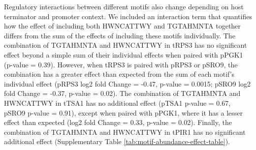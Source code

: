 \documentclass{SBCbookchapter}
\begin{document}
Regulatory interactions between different motifs also change depending on host terminator and promoter context.
We included an interaction term that quantifies how the effect of including both HWNCATTWY and TGTAHMNTA together differs from the sum of the effects of including these motifs individually.
The combination of TGTAHMNTA and HWNCATTWY in tRPS3 has no significant effect beyond a simple sum of their individual effects when paired with pPGK1 (p-value = 0.39).
However, when tRPS3 is paired with pRPS3 or pSRO9, the combination has a greater effect than expected from the sum of each motif's individual effect (pRPS3 log2 fold Change = -0.47, p-value = 0.0015; pSRO9 log2 fold Change = -0.37, p-value = 0.02).
The combination of TGTAHMNTA and HWNCATTWY in tTSA1 has no additional effect (pTSA1 p-value = 0.67, pSRO9 p-value = 0.91), except when paired with pPGK1, where it has a lesser effect than expected (log2 fold Change = 0.33, p-value = 0.02).
Finally, the combination of TGTAHMNTA and HWNCATTWY in tPIR1 has no significant additional effect (Supplementary Table \ref{tab:motif-abundance-effect-table}).
\end{document}
